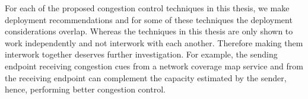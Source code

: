 





For each of the proposed congestion control techniques in this thesis, we make
deployment recommendations and for some of these techniques the deployment
considerations overlap. Whereas the techniques in this thesis are only shown
to work independently and not interwork with each another. Therefore making
them interwork together deserves further investigation. For example, the
sending endpoint receiving congestion cues from a network coverage map service
and from the receiving endpoint can complement the capacity estimated by the
sender, hence, performing better congestion control.



